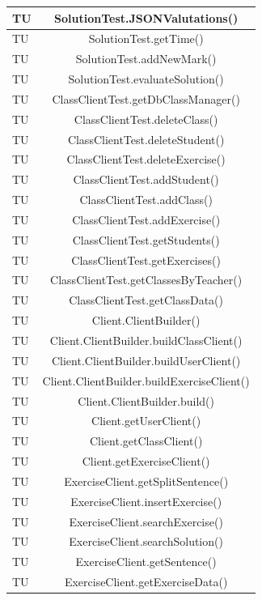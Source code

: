 \begin{longtable}{|>{\centering\arraybackslash}m{1.6cm}|c|}
		TU & SolutionTest.JSONValutations()\\ \hline
		TU & SolutionTest.getTime()\\ \hline
		TU & SolutionTest.addNewMark()\\ \hline
		TU & SolutionTest.evaluateSolution()\\ \hline
		TU & ClassClientTest.getDbClassManager()  \\ \hline
		TU & ClassClientTest.deleteClass()  \\ \hline
		TU & ClassClientTest.deleteStudent()  \\ \hline
		TU & ClassClientTest.deleteExercise()  \\ \hline
		TU & ClassClientTest.addStudent()  \\ \hline
		TU & ClassClientTest.addClass()  \\ \hline
		TU & ClassClientTest.addExercise()  \\ \hline
		TU & ClassClientTest.getStudents()  \\ \hline
		TU & ClassClientTest.getExercises()  \\ \hline
		TU & ClassClientTest.getClassesByTeacher()  \\ \hline
		TU & ClassClientTest.getClassData()  \\ \hline
		TU & Client.ClientBuilder()   \\ \hline
		TU & Client.ClientBuilder.buildClassClient()  \\ \hline
		TU & Client.ClientBuilder.buildUserClient()  \\ \hline
		TU & Client.ClientBuilder.buildExerciseClient()  \\ \hline
		TU & Client.ClientBuilder.build() \\ \hline	
		TU & Client.getUserClient()  \\ \hline
		TU & Client.getClassClient()  \\ \hline
		TU & Client.getExerciseClient()  \\ \hline
		TU & ExerciseClient.getSplitSentence()  \\ \hline
		TU & ExerciseClient.insertExercise()  \\ \hline
		TU & ExerciseClient.searchExercise()  \\ \hline
		TU & ExerciseClient.searchSolution()  \\ \hline
		TU & ExerciseClient.getSentence()  \\ \hline
		TU & ExerciseClient.getExerciseData()  \\ \hline

\end{longtable}
